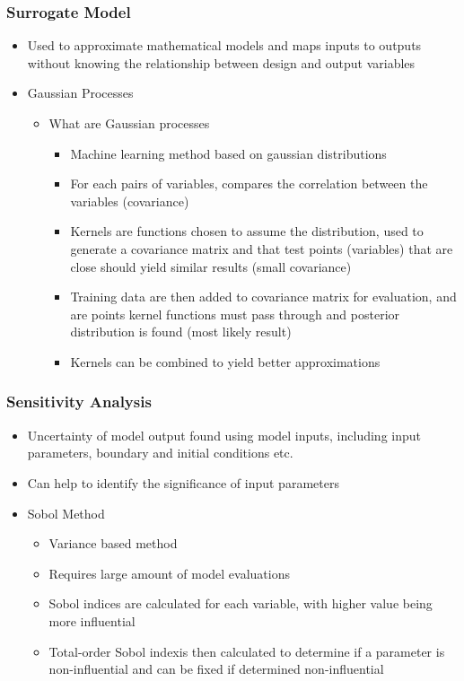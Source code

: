 \documentclass{article}
\begin{document}
    \subsubsection*{Surrogate Model}
    \begin{itemize}
        \item Used to approximate mathematical models and maps inputs to outputs without knowing the relationship between design and output variables \cite{williams_novel_2021}
        \item Gaussian Processes
        \begin{itemize}
            \item What are Gaussian processes \cite{hornsby_gaussian_2024}
            \begin{itemize}    
                \item Machine learning method based on gaussian distributions
                \item For each pairs of variables, compares the correlation between the variables (covariance)
                \item Kernels are functions chosen to assume the distribution, used to generate a covariance matrix and that test points (variables) that are close should yield similar results (small covariance) \cite{duvenaud_automatic_2014}
                \item Training data are then added to covariance matrix for evaluation, and are points kernel functions must pass through and posterior distribution is found (most likely result)
                \item Kernels can be combined to yield better approximations \cite{duvenaud_automatic_2014}
            \end{itemize}
        \end{itemize}
    \end{itemize}
    \subsubsection*{Sensitivity Analysis \cite{wirthl_global_2023} } 
    \begin{itemize}
        \item Uncertainty of model output found using model inputs, including input parameters, boundary and initial conditions etc.
        \item Can help to identify the significance of input parameters
        \item Sobol Method
        \begin{itemize}
            \item Variance based method
            \item Requires large amount of model evaluations
            \item Sobol indices are calculated for each variable, with higher value being more influential
            \item Total-order Sobol indexis then calculated to determine if a parameter is non-influential and can be fixed if determined non-influential
        \end{itemize}
    \end{itemize}
\pagebreak
\end{document}
